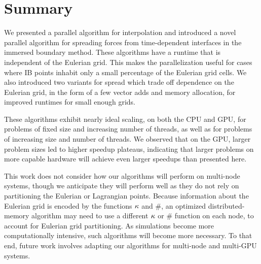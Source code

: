 \section{Summary} \label{sec:summary}

We presented a parallel algorithm for interpolation and introduced a novel parallel
algorithm for spreading forces from time-dependent interfaces in the immersed boundary
method. These algorithms have a runtime that is independent of the Eulerian grid. This
makes the parallelization useful for cases where IB points inhabit only a small
percentage of the Eulerian grid cells. We also introduced two variants for spread which
trade off dependence on the Eulerian grid, in the form of a few vector adds and memory
allocation, for improved runtimes for small enough grids.

These algorithms exhibit nearly ideal scaling, on both the CPU and GPU, for problems of
fixed size and increasing number of threads, as well as for problems of increasing size
and number of threads.  We observed that on the GPU, larger problem sizes led to higher
speedup plateaus, indicating that larger problems on more capable hardware will achieve
even larger speedups than presented here.

This work does not consider how our algorithms will perform on multi-node systems, though
we anticipate they will perform well as they do not rely on partitioning the Eulerian or
Lagrangian points. Because information about the Eulerian grid is encoded by the
functions $\kappa$ and $\#$, an optimized distributed-memory algorithm may need to use a
different $\kappa$ or $\#$ function on each node, to account for Eulerian grid
partitioning. As simulations become more computationally intensive, such algorithms will
become more necessary. To that end, future work involves adapting our algorithms for
multi-node and multi-GPU systems.


